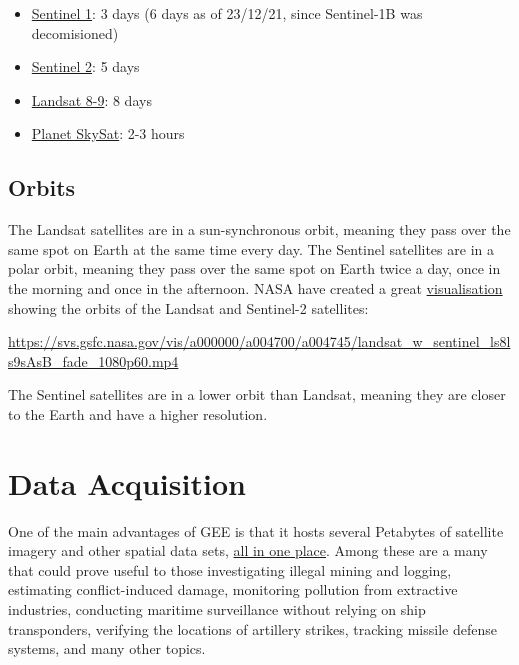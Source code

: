\documentclass[
  letterpaper,
  DIV=11,
  numbers=noendperiod]{scrreprt}
\providecommand{\tightlist}{%
  \setlength{\itemsep}{0pt}\setlength{\parskip}{0pt}}\usepackage{longtable,booktabs,array}
\begin{document}
\begin{itemize}
\tightlist
\item
  \href{https://sentinels.copernicus.eu/web/sentinel/user-guides/sentinel-1-sar/revisit-and-coverage}{Sentinel
  1}: 3 days (6 days as of 23/12/21, since Sentinel-1B was decomisioned)
\item
  \href{https://sentinel.esa.int/web/sentinel/missions/sentinel-2}{Sentinel
  2}: 5 days
\item
  \href{https://landsat.gsfc.nasa.gov/satellites/landsat-9/\#:~:text=Landsat\%209\%20replaces\%20Landsat\%207,for\%20Landsat\%208\%20\%2B\%20Landsat\%207.}{Landsat
  8-9}: 8 days
\item
  \href{https://www.planet.com/pulse/12x-rapid-revisit-announcement/}{Planet
  SkySat}: 2-3 hours
\end{itemize}

\hypertarget{orbits}{%
\section{Orbits}\label{orbits}}

The Landsat satellites are in a sun-synchronous orbit, meaning they pass
over the same spot on Earth at the same time every day. The Sentinel
satellites are in a polar orbit, meaning they pass over the same spot on
Earth twice a day, once in the morning and once in the afternoon. NASA
have created a great
\href{https://svs.gsfc.nasa.gov/4745}{visualisation} showing the orbits
of the Landsat and Sentinel-2 satellites:

\url{https://svs.gsfc.nasa.gov/vis/a000000/a004700/a004745/landsat_w_sentinel_ls8ls9sAsB_fade_1080p60.mp4}

The Sentinel satellites are in a lower orbit than Landsat, meaning they
are closer to the Earth and have a higher resolution.

\hypertarget{data-acquisition}{%
\chapter{Data Acquisition}\label{data-acquisition}}

One of the main advantages of GEE is that it hosts several Petabytes of
satellite imagery and other spatial data sets,
\href{https://developers.google.com/earth-engine/datasets}{all in one
place}. Among these are a many that could prove useful to those
investigating illegal mining and logging, estimating conflict-induced
damage, monitoring pollution from extractive industries, conducting
maritime surveillance without relying on ship transponders, verifying
the locations of artillery strikes, tracking missile defense systems,
and many other topics.
\end{document}
